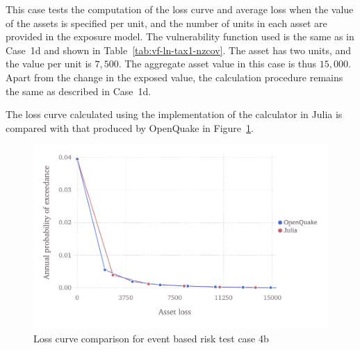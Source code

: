 This case tests the computation of the loss curve and average loss when the value of the assets is specified per unit, and the number of units in each asset are provided in the exposure model. The vulnerability function used is the same as in Case~1d and shown in Table~\ref{tab:vf-ln-tax1-nzcov}. The asset has two units, and the value per unit is $7,500$. The aggregate asset value in this case is thus $15,000$. Apart from the change in the exposed value, the calculation procedure remains the same as described in Case~1d.

The loss curve calculated using the implementation of the calculator in Julia is compared with that produced by OpenQuake in Figure~\ref{fig:lc-ebr-4b}.

\begin{figure}[htbp]
\centering
\includegraphics[width=12cm]{qareport/figures/fig-lc-ebr-4b}
\caption{Loss curve comparison for event based risk test case 4b}
\label{fig:lc-ebr-4b}
\end{figure}